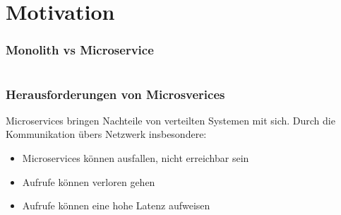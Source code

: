 \section{Motivation}

\begin{frame}
    \frametitle{Monolith vs Microservice}

    \begin{columns}
        
        \begin{column}{0.5\textwidth}
        \end{column}

        \begin{column}{0.5\textwidth}
            
            
        \end{column}


    \end{columns}

    
\end{frame}

\begin{frame}
    \frametitle{Herausforderungen von Microsverices}

    Microservices bringen Nachteile von verteilten Systemen mit sich. Durch die Kommunikation übers Netzwerk insbesondere:

    \begin{itemize}
        
        \item Microservices können ausfallen, nicht erreichbar sein
        \item Aufrufe können verloren gehen
        \item Aufrufe können eine hohe Latenz aufweisen
    \end{itemize}
\end{frame}


